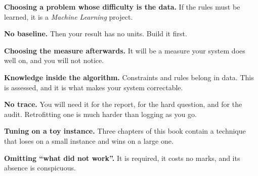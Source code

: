 \begin{pitfall}
\begin{tight}
  \item \textbf{Choosing a problem whose difficulty is the data.} If the rules must
        be learned, it is a \emph{Machine Learning} project.
  \item \textbf{No baseline.} Then your result has no units. Build it first.
  \item \textbf{Choosing the measure afterwards.} It will be a measure your system
        does well on, and you will not notice.
  \item \textbf{Knowledge inside the algorithm.} Constraints and rules belong in
        data. This is assessed, and it is what makes your system correctable.
  \item \textbf{No trace.} You will need it for the report, for the hard question,
        and for the audit. Retrofitting one is much harder than logging as you go.
  \item \textbf{Tuning on a toy instance.} Three chapters of this book contain a
        technique that loses on a small instance and wins on a large one.
  \item \textbf{Omitting ``what did not work''.} It is required, it costs no marks,
        and its absence is conspicuous.
\end{tight}
\end{pitfall}

